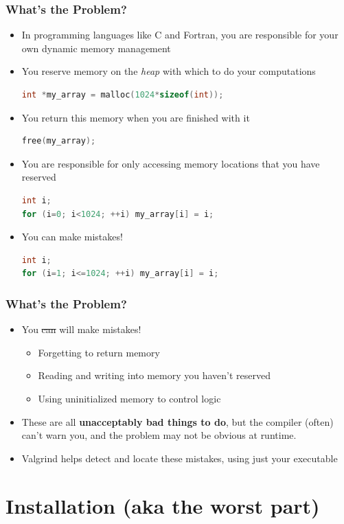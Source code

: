 \documentclass{beamer}
\begin{document}
\begin{frame}[fragile]
\frametitle{What's the Problem?}
\begin{itemize}
\item In programming languages like C and Fortran, you are responsible for your own dynamic memory management
\item You reserve memory on the \emph{heap} with which to do your computations
\begin{lstlisting}[language=C]
int *my_array = malloc(1024*sizeof(int));
\end{lstlisting}
\item You return this memory when you are finished with it
\begin{lstlisting}[language=C]
free(my_array);
\end{lstlisting}
\item You are responsible for only accessing memory locations that you have reserved
\begin{lstlisting}[language=C]
int i;
for (i=0; i<1024; ++i) my_array[i] = i;
\end{lstlisting}
\item You can make mistakes!
\begin{lstlisting}[language=C]
int i;
for (i=1; i<=1024; ++i) my_array[i] = i;
\end{lstlisting}
\end{itemize}
\end{frame}

\begin{frame}[fragile]
\frametitle{What's the Problem?}
\begin{itemize}
  \item You \sout{can} will make mistakes!
\begin{itemize}
\item Forgetting to return memory
\item Reading and writing into memory you haven't reserved
\item Using uninitialized memory to control logic
\end{itemize}
\item These are all {\bf unacceptably bad things to do}, but the compiler (often) can't warn you, and the problem may not be obvious at runtime.
\item Valgrind helps detect and locate these mistakes, using just your executable
\end{itemize}
\end{frame}

\section{Installation (aka the worst part)}
\end{document}
